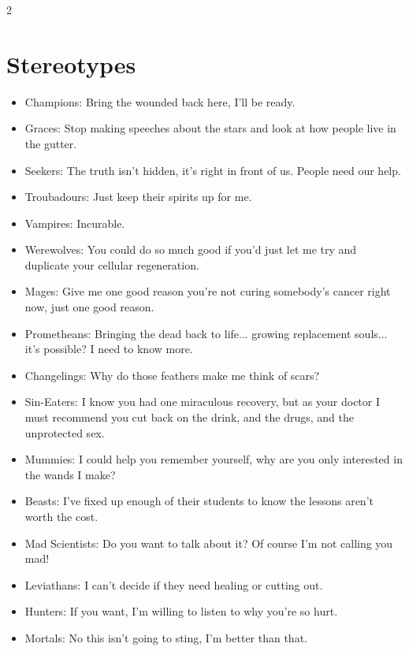 \begin{multicols}{2}
\section*{Stereotypes}
\begin{itemize}
\item Champions: Bring the wounded back here, I'll be ready. 
\item Graces: Stop making speeches about the stars and look at how people live in the gutter. 
\item Seekers: The truth isn't hidden, it's right in front of us. People need our help. 
\item Troubadours: Just keep their spirits up for me. 
 
\item Vampires: Incurable. 
\item Werewolves: You could do so much good if you'd just let me try and duplicate your cellular regeneration. 
\item Mages: Give me one good reason you're not curing somebody's cancer right now, just one good reason. 
\item Prometheans: Bringing the dead back to life... growing replacement souls... it's possible? I need to know more. 
\item Changelings: Why do those feathers make me think of scars?
\item Sin-Eaters: I know you had one miraculous recovery, but as your doctor I must recommend you cut back on the drink, and the drugs, and the unprotected sex.
\item Mummies: I could help you remember yourself, why are you only interested in the wands I make? 
\item Beasts: I've fixed up enough of their students to know the lessons aren't worth the cost.

\item Mad Scientists: Do you want to talk about it? Of course I'm not calling you mad!
\item Leviathans: I can't decide if they need healing or cutting out.

\item Hunters: If you want, I'm willing to listen to why you're so hurt.
\item Mortals: No this isn't going to sting, I'm better than that. 
\end{itemize}


\end{multicols}
